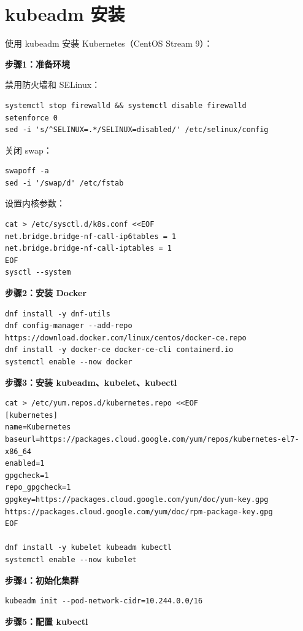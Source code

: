 \documentclass[12pt,UTF8]{ctexbook}
\begin{document}
\section{kubeadm 安装}
\label{sec:kubeadm_install}

使用 kubeadm 安装 Kubernetes（CentOS Stream 9）：

\textbf{步骤1：准备环境}

禁用防火墙和 SELinux：
\begin{lstlisting}
systemctl stop firewalld && systemctl disable firewalld
setenforce 0
sed -i 's/^SELINUX=.*/SELINUX=disabled/' /etc/selinux/config
\end{lstlisting}

关闭 swap：
\begin{lstlisting}
swapoff -a
sed -i '/swap/d' /etc/fstab
\end{lstlisting}

设置内核参数：
\begin{lstlisting}
cat > /etc/sysctl.d/k8s.conf <<EOF
net.bridge.bridge-nf-call-ip6tables = 1
net.bridge.bridge-nf-call-iptables = 1
EOF
sysctl --system
\end{lstlisting}

\textbf{步骤2：安装 Docker}

\begin{lstlisting}
dnf install -y dnf-utils
dnf config-manager --add-repo https://download.docker.com/linux/centos/docker-ce.repo
dnf install -y docker-ce docker-ce-cli containerd.io
systemctl enable --now docker
\end{lstlisting}

\textbf{步骤3：安装 kubeadm、kubelet、kubectl}

\begin{lstlisting}
cat > /etc/yum.repos.d/kubernetes.repo <<EOF
[kubernetes]
name=Kubernetes
baseurl=https://packages.cloud.google.com/yum/repos/kubernetes-el7-x86_64
enabled=1
gpgcheck=1
repo_gpgcheck=1
gpgkey=https://packages.cloud.google.com/yum/doc/yum-key.gpg https://packages.cloud.google.com/yum/doc/rpm-package-key.gpg
EOF

dnf install -y kubelet kubeadm kubectl
systemctl enable --now kubelet
\end{lstlisting}

\textbf{步骤4：初始化集群}

\begin{lstlisting}
kubeadm init --pod-network-cidr=10.244.0.0/16
\end{lstlisting}

\textbf{步骤5：配置 kubectl}
\end{document}
